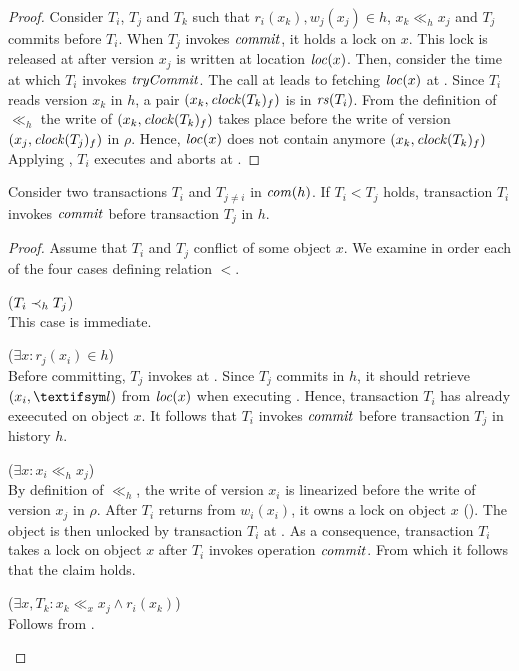 \begin{proof}
  Consider $T_i$, $T_j$ and $T_k$ such that $r_i(x_k), w_j(x_j) \in h$, $x_k \ll_h x_j$ and $T_j$ commits before $T_i$.
  When $T_j$ invokes $\stmCommitFunction$, it holds a lock on $x$.
  This lock is released at  after version $x_j$ is written at location $\locationOf{x}$.
  Then, consider the time at which $T_i$ invokes $\stmTryCommitFunction$.
  The call at  leads to fetching $\locationOf{x}$ at .
  Since $T_i$ reads version $x_k$ in $h$, a pair $(x_k,\clockOf{T_k}_f)$ is in $\readSetOf{T_i}$.
  From the definition of $\ll_h$ the write of $(x_k,\clockOf{T_k}_f)$ takes place before the write of version $(x_j,\clockOf{T_j}_f)$ in $\rho$.
  Hence, $\locationOf{x}$ does not contain anymore $(x_k,\clockOf{T_k}_f)$
  Applying , $T_i$ executes  and aborts at .
\end{proof}

\begin{proposition}
  Consider two transactions $T_i$ and $T_{j \neq i}$ in $\committed{h}$.
  If $T_i < T_j$ holds, transaction $T_i$ invokes $\stmCommitFunction$ before transaction $T_j$ in $h$.
\end{proposition}

\begin{proof}
  Assume that $T_i$ and $T_j$ conflict of some object $x$.
  We examine in order each of the four cases defining relation $<$.
  \begin{compactitem}
  \item ($T_i \hb_h T_j$)\\
    This case is immediate.
  \item ($\exists x : r_j(x_i) \in h$)\\
    Before committing, $T_j$ invokes \stmExtendFunction at .
    Since $T_j$ commits in $h$, it should retrieve $(x_i,\msgAny)$ from $\locationOf{x}$ when executing .
    Hence, transaction $T_i$ has already exeecuted  on object $x$.
    It follows that $T_i$ invokes $\stmCommitFunction$ before transaction $T_j$ in history $h$.
  \item ($\exists x : x_i \ll_h x_j$)\\
    By definition of $\ll_h$, the write of version $x_i$ is linearized before the write of version $x_j$ in $\rho$.
    After $T_i$ returns from $w_i(x_i)$, it owns a lock on object $x$ ().
    The object is then unlocked by transaction $T_i$ at .
    As a consequence, transaction $T_i$ takes a lock on object $x$ after $T_i$ invokes operation $\stmCommitFunction$.
    From which it follows that the claim holds.
  \item ($\exists x, T_k : x_k \ll_x x_j \land r_i(x_k)$)\\
    Follows from .
  \end{compactitem}
  
\end{proof}

